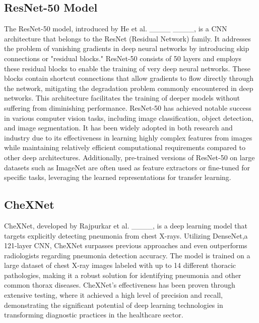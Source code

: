 \subsection{ResNet-50 Model}
The ResNet-50 model, introduced by He et al. ____ ____, is a CNN architecture that belongs to the ResNet (Residual Network) family. It addresses the problem of vanishing gradients in deep neural networks by introducing skip connections or "residual blocks." ResNet-50 consists of 50 layers and employs these residual blocks to enable the training of very deep neural networks. These blocks contain shortcut connections that allow gradients to flow directly through the network, mitigating the degradation problem commonly encountered in deep networks. This architecture facilitates the training of deeper models without suffering from diminishing performance. ResNet-50 has achieved notable success in various computer vision tasks, including image classification, object detection, and image segmentation. It has been widely adopted in both research and industry due to its effectiveness in learning highly complex features from images while maintaining relatively efficient computational requirements compared to other deep architectures. Additionally, pre-trained versions of ResNet-50 on large datasets such as ImageNet are often used as feature extractors or fine-tuned for specific tasks, leveraging the learned representations for transfer learning.

\subsection{CheXNet}
CheXNet, developed by Rajpurkar et al. ____, is a deep learning model that targets explicitly detecting pneumonia from chest X-rays. Utilizing DenseNet,a 121-layer CNN, CheXNet surpasses previous approaches and even outperforms radiologists regarding pneumonia detection accuracy. The model is trained on a large dataset of chest X-ray images labeled with up to 14 different thoracic pathologies, making it a robust solution for identifying pneumonia and other common thorax diseases. CheXNet's effectiveness has been proven through extensive testing, where it achieved a high level of precision and recall, demonstrating the significant potential of deep learning technologies in transforming diagnostic practices in the healthcare sector.

